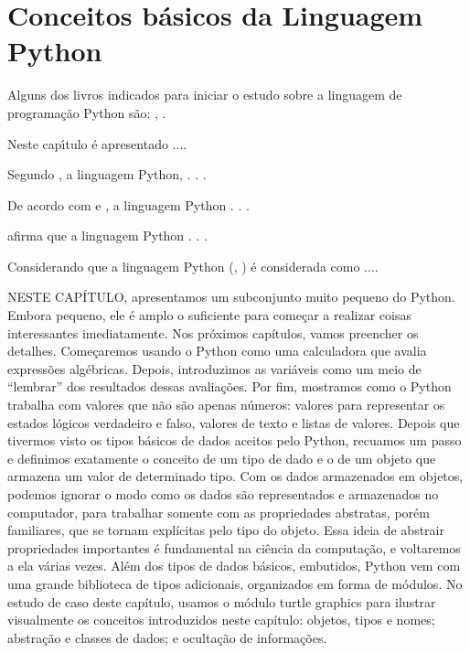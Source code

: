 

\chapter{ Conceitos básicos da Linguagem Python}

Alguns dos livros indicados para iniciar o estudo sobre a linguagem de programação Python são:  \cite{Lutz2007}, \cite{Perkovic2016}.

Neste cap\'{\i}tulo \'{e} apresentado ....

Segundo \cite{seb11}, a linguagem Python,  . . .

De acordo com \cite{seb11} e \cite{roy04}, a linguagem Python . . .

\cite{seb11} afirma que a linguagem Python . . .

Considerando que a linguagem Python (\cite{seb11}, \cite{wat90}) \'{e} considerada como ....

NESTE CAPÍTULO, apresentamos um subconjunto muito pequeno do Python. Embora pequeno, ele
é amplo o suficiente para começar a realizar coisas interessantes imediatamente. Nos próximos
capítulos, vamos preencher os detalhes. Começaremos usando o Python como uma calculadora
que avalia expressões algébricas. Depois, introduzimos as variáveis como um meio de “lembrar” dos
resultados dessas avaliações. Por fim, mostramos como o Python trabalha com valores que não são
apenas números: valores para representar os estados lógicos verdadeiro e falso, valores de texto e
listas de valores.
Depois que tivermos visto os tipos básicos de dados aceitos pelo Python, recuamos um passo e
definimos exatamente o conceito de um tipo de dado e o de um objeto que armazena um valor de
determinado tipo. Com os dados armazenados em objetos, podemos ignorar o modo como os dados
são representados e armazenados no computador, para trabalhar somente com as propriedades
abstratas, porém familiares, que se tornam explícitas pelo tipo do objeto. Essa ideia de abstrair
propriedades importantes é fundamental na ciência da computação, e voltaremos a ela várias vezes.
Além dos tipos de dados básicos, embutidos, Python vem com uma grande biblioteca de tipos
adicionais, organizados em forma de módulos. No estudo de caso deste capítulo, usamos o módulo
turtle graphics para ilustrar visualmente os conceitos introduzidos neste capítulo: objetos, tipos e
nomes; abstração e classes de dados; e ocultação de informações.

